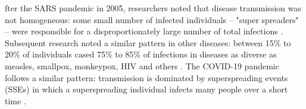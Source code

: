 \documentclass[9pt,twocolumn,twoside, lineno]{pnas-new}
\begin{document}







fter the SARS pandemic in 2005, researchers noted that disease transmission
was not homogeneous: some small number of infected individuals –
"super spreaders" – were responsible for a disproportionately large number of
total infections \cite{nature2005}. Subsequent research noted a similar pattern in
other diseases: between 15\% to 20\% of individuals cased 75\% to 85\% of infections
in diseases as diverse as measles, smallpox, monkeypox, HIV and others
\cite{dimensionsOfSuperspreading}. The COVID-19 pandemic follows a similar pattern:
transmission is dominated by superspreading events (SSEs) in which a 
superspreading individual infects many people over a short time
\cite{plos2020} \cite{nature2021}.
\end{document}
